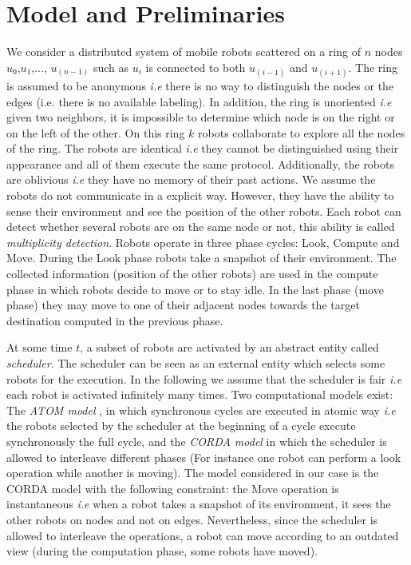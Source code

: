 \documentclass[12pt]{llncs}
\begin{document}
\section{Model and Preliminaries}\label{sec:Model}

We consider a distributed system of mobile robots scattered on a ring of $n$ nodes $u_{0}$,$u_{1}$,..., $u_{(n-1)}$ such as $u_{i}$ is connected to both $u_{(i-1)}$ and $u_{(i+1)}$. The ring is assumed to be anonymous \textit{i.e} there is no way to distinguish the nodes or the edges (i.e. there is no available labeling). In addition, the ring is unoriented \textit{i.e} given two neighbors, it is impossible to determine which node is on the right or on the left of the other. 
On this ring $k$ robots collaborate to explore all the nodes of the ring. The robots are identical \textit{i.e} they cannot be distinguished using their appearance and all of them execute the same protocol. Additionally, the robots are oblivious \textit{i.e} they have no memory of their past actions. We assume the robots do not communicate in a explicit way. However, they have the ability to sense their environment and see the position of the other robots. Each robot can detect whether several robots are on the same node or not, this ability is called \textit{multiplicity detection}. Robots operate in three phase cycles: Look, Compute and Move. During the Look phase robots take a snapshot of their environment. The collected information (position of the other robots) are used in the compute phase in which robots decide to move or to stay idle. In the last phase (move phase) they may move to one of their adjacent nodes towards the target destination computed in the previous phase.   

At some time $t$, a subset of robots are activated by an abstract entity called \textit{scheduler}. The scheduler can be seen as an external entity which selects some robots for the execution. In the following we assume that the scheduler is fair \textit{i.e} each robot is activated infinitely many times. Two computational models exist: The \textit{ATOM model} \cite{yama99}, in which synchronous cycles are executed in atomic way \textit{i.e} the robots selected by the scheduler at the beginning of a cycle execute synchronously the full cycle, and the \textit{CORDA model} \cite{Pre01} in which the scheduler is allowed to interleave different phases (For instance one robot can perform a look operation while another is moving).
The model considered in our case is the CORDA model with the following constraint: the Move operation is instantaneous \textit{i.e} when a robot takes a snapshot of its environment, it sees the other robots on nodes and not on edges. Nevertheless, since the scheduler is allowed to interleave the operations, a robot can move according to an outdated view (during the computation phase, some robots have moved).
\end{document}
